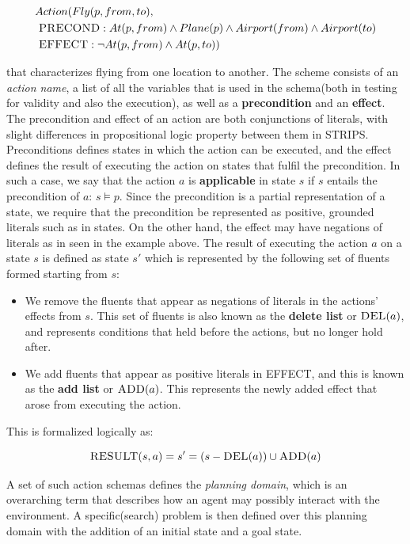 \documentclass[11pt]{article}
\begin{document}
$$
\begin{aligned}
&Action(Fly(p, from, to),\\
&\ \textsc{PRECOND}: At(p, from) \land Plane(p) \land Airport(from) \land Airport(to)\\
&\ \textsc{EFFECT}: \lnot At(p, from) \land At(p, to))
\end{aligned}
$$

that characterizes flying from one location to another. The scheme consists of an \textit{action name}, a list of all the variables that is used in the schema(both in testing for validity and also the execution), as well as a \textbf{precondition} and an \textbf{effect}. The precondition and effect of an action are both conjunctions of literals, with slight differences in propositional logic property between them in \textsc{STRIPS}.\\

Preconditions defines states in which the action can be executed, and the effect defines the result of executing the action on states that fulfil the precondition. In such a case, we say that the action $a$ is \textbf{applicable} in state $s$ if $s$ entails the precondition of $a$: $s \models p$. Since the precondition is a partial representation of a state, we require that the precondition be represented as positive, grounded literals such as in states. On the other hand, the effect may have negations of literals as in seen in the example above. The result of executing the action $a$ on a state $s$ is defined as state $s'$ which is represented by the following set of fluents formed starting from $s$:

\begin{itemize}
    \item We remove the fluents that appear as negations of literals in the actions' effects from $s$. This set of fluents is also known as the \textbf{delete list} or $\textsc{DEL}(a)$, and represents conditions that held before the actions, but no longer hold after.
    \item We add fluents that appear as positive literals in \textsc{EFFECT}, and this is known as the \textbf{add list} or $\textsc{ADD}(a)$. This represents the newly added effect that arose from executing the action.
\end{itemize}

This is formalized logically as:

$$
\textsc{RESULT}(s, a)  = s' = (s - \textsc{DEL}(a)) \cup \textsc{ADD}(a)
$$

A set of such action schemas defines the \textit{planning domain}, which is an overarching term that describes how an agent may possibly interact with the environment. A specific(search) problem is then defined over this planning domain with the addition of an initial state and a goal state.
\end{document}
